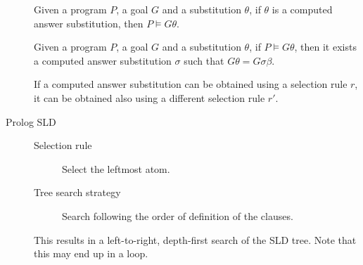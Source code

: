 \begin{description}
        \begin{theorem}[Soundness]
            Given a program $P$, a goal $G$ and a substitution $\theta$,
            if $\theta$ is a computed answer substitution, then $P \models G\theta$.
        \end{theorem}

        \begin{theorem}[Completeness]
            Given a program $P$, a goal $G$ and a substitution $\theta$,
            if $P \models G\theta$, then it exists a computed answer substitution $\sigma$ such that $G\theta = G\sigma\beta$.
        \end{theorem}

        \begin{theorem}
            If a computed answer substitution can be obtained using a selection rule $r$, 
            it can be obtained also using a different selection rule $r'$.
        \end{theorem}

    \item[Prolog SLD] 
        \begin{description}
            \item[Selection rule] Select the leftmost atom.
            \item[Tree search strategy] Search following the order of definition of the clauses.
        \end{description}

        This results in a left-to-right, depth-first search of the SLD tree.
        Note that this may end up in a loop.
\end{description}